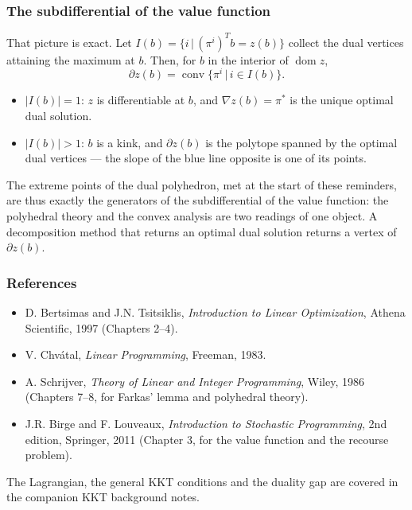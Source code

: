 \documentclass[aspectratio=169]{beamer}
\providecommand{\red}{\color{red}}
\begin{document}
\begin{frame}
\frametitle{The subdifferential of the value function}

That picture is exact. Let $I(b) = \lbrace i \,|\, (\pi^i)^Tb = z(b) \rbrace$ collect the dual vertices attaining the maximum at $b$. Then, for $b$ in the interior of $\operatorname{dom} z$,
\[
\partial z(b) = \operatorname{conv} \lbrace \pi^i \,|\, i \in I(b) \rbrace .
\]

\begin{itemize}
	\item
	$|I(b)| = 1$: $z$ is differentiable at $b$, and $\nabla z(b) = \pi^*$ is the unique optimal dual solution.
	\item
	$|I(b)| > 1$: $b$ is a kink, and $\partial z(b)$ is the polytope spanned by the optimal dual vertices --- the slope of the blue line opposite is one of its points.
\end{itemize}

\vspace{1mm}

The extreme points of the dual polyhedron, met at the start of these reminders, are thus exactly the {\red generators of the subdifferential} of the value function: the polyhedral theory and the convex analysis are two readings of one object. A decomposition method that returns an optimal dual solution returns a vertex of $\partial z(b)$.

\end{frame}

\begin{frame}
\frametitle{References}

\begin{itemize}
\item
D. Bertsimas and J.N. Tsitsiklis, \emph{Introduction to Linear Optimization}, Athena Scientific, 1997 (Chapters 2--4).
\item
V. Chv\'atal, \emph{Linear Programming}, Freeman, 1983.
\item
A. Schrijver, \emph{Theory of Linear and Integer Programming}, Wiley, 1986 (Chapters 7--8, for Farkas' lemma and polyhedral theory).
\item
J.R. Birge and F. Louveaux, \emph{Introduction to Stochastic Programming}, 2nd edition, Springer, 2011 (Chapter 3, for the value function and the recourse problem).
\end{itemize}

\mbox{}

The Lagrangian, the general KKT conditions and the duality gap are covered in the companion {\red KKT background notes}.

\end{frame}
\end{document}
